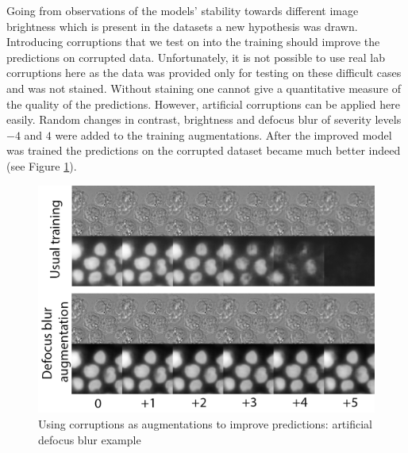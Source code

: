 Going from observations of the models' stability towards different image brightness which is present in the datasets a new hypothesis was drawn. Introducing corruptions that we test on into the training should improve the predictions on corrupted data. Unfortunately, it is not possible to use real lab corruptions here as the data was provided only for testing on these difficult cases and was not stained. Without staining one cannot give a quantitative measure of the quality of the predictions. However, artificial corruptions can be applied here easily. Random changes in contrast, brightness and defocus blur of severity levels $-4$ and $4$ were added to the training augmentations. After the improved model was trained the predictions on the corrupted dataset became much better indeed (see Figure \ref{fig:augments-help}).

\begin{figure}[htb]
	\begin{center}
		\includegraphics[width=0.4\linewidth]{bilder/stability/augments-help.png}
		\caption[Using corruptions as augmentations to improve predictions: artificial defocus blur example]%
        {Using corruptions as augmentations to improve predictions: artificial defocus blur example}\label{fig:augments-help}
	\end{center}
\end{figure}

